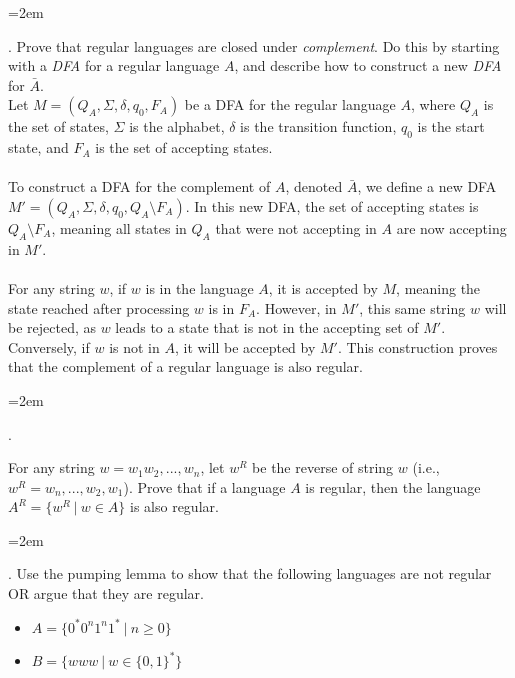 \documentclass[12pt]{article}
\newcounter{quesnum}
\newcommand{\question}[2][??]{
\begin{list}{\labelitemi}{\leftmargin=2em}
\item [\arabic{quesnum}.] {} {#2}
\end{list}
\addtocounter{quesnum}{1}
}
\begin{document}

\vspace{12pt}

\question[3]{
Prove that regular languages are closed under \emph{complement}. Do this by starting with a \emph{DFA} for a regular language $A$, and describe how to construct a new \emph{DFA} for $\bar{A}$.
\\

Let $M = (Q_A, \Sigma, \delta, q_0, F_A)$ be a DFA for the regular language $A$, where $Q_A$ is the set of states, $\Sigma$ is the alphabet, $\delta$ is the transition function, $q_0$ is the start state, and $F_A$ is the set of accepting states.\\
\\
To construct a DFA for the complement of $A$, denoted $\bar{A}$, we define a new DFA $M' = (Q_A, \Sigma, \delta, q_0, Q_A \setminus F_A)$. In this new DFA, the set of accepting states is $Q_A \setminus F_A$, meaning all states in $Q_A$ that were not accepting in $A$ are now accepting in $M'$.\\
\\
For any string $w$, if $w$ is in the language $A$, it is accepted by $M$, meaning the state reached after processing $w$ is in $F_A$. However, in $M'$, this same string $w$ will be rejected, as $w$ leads to a state that is not in the accepting set of $M'$. Conversely, if $w$ is not in $A$, it will be accepted by $M'$. This construction proves that the complement of a regular language is also regular.
}

\vspace{12pt}

\question[3]{
For any string $w = w_1w_2,...,w_n$, let $w^R$ be the reverse of string $w$ (i.e., $w^R=w_n,...,w_2,w_1$). Prove that if a language $A$ is regular, then the language $A^R = \{w^R \ | \ w \in A\}$ is also regular.


}


\vspace{12pt}

\question[3]{
Use the pumping lemma to show that the following languages are not regular OR argue that they are regular. 
}

\begin{itemize}
	\item $A= \{ 0^*0^n1^n1^* \ | \ n \geq 0\}$
	\item $B= \{ www \ | \ w \in \{0,1\}^* \}$
\end{itemize}
\end{document}
